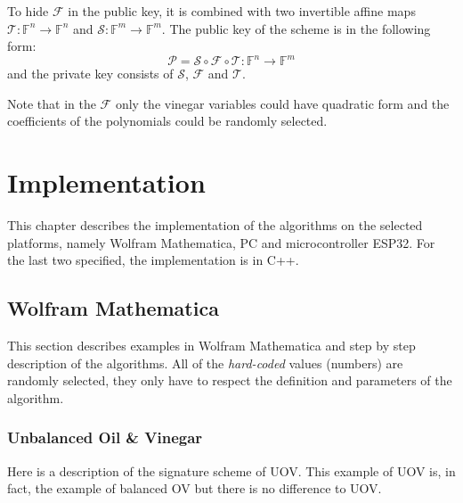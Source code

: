 \documentclass[thesis=M,english]{FITthesis}[2019/12/23]
\begin{document}
\bigskip
\noindent
To hide $\mathcal{F}$ in the public key, it is combined with two invertible affine maps $\mathcal{T}: \mathbb{F}^n \rightarrow \mathbb{F}^n$ and $\mathcal{S}: \mathbb{F}^m \rightarrow \mathbb{F}^m$. The public key of the scheme is in the following form:
\[
\mathcal{P} = \mathcal{S} \circ \mathcal{F} \circ \mathcal{T} : \mathbb{F}^n \rightarrow \mathbb{F}^m
\]
and the private key consists of $\mathcal{S}$, $\mathcal{F}$ and $\mathcal{T}$.

\bigskip
\noindent
Note that in the $\mathcal{F}$ only the vinegar variables could have quadratic form and the coefficients of the polynomials could be randomly selected.

\chapter{Implementation}
This chapter describes the implementation of the algorithms on the selected platforms, namely Wolfram Mathematica, PC and microcontroller ESP32. For the last two specified, the implementation is in C++.

\section{Wolfram Mathematica}
This section describes examples in Wolfram Mathematica and step by step description of the algorithms. All of the \textit{hard-coded} values (numbers) are randomly selected, they only have to respect the definition and parameters of the algorithm.

\subsection{Unbalanced Oil \& Vinegar}
Here is a description of the signature scheme of UOV. This example of UOV is, in fact, the example of balanced OV but there is no difference to UOV.
\end{document}

